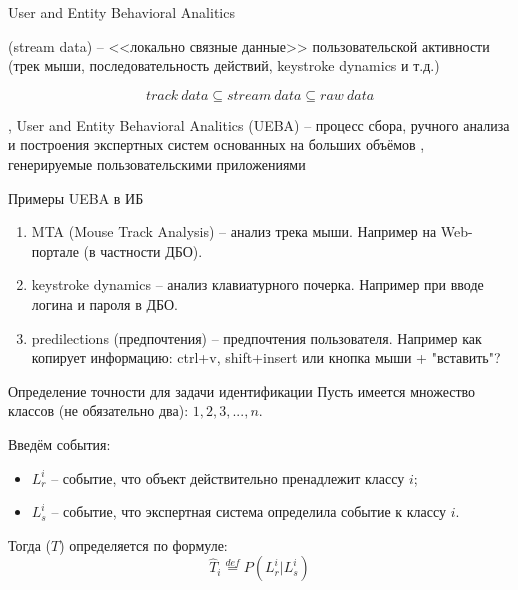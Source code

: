 \begin{frame}{User and Entity Behavioral Analitics}

	 (stream data) -- 
	<<локально связные данные>> пользовательской активности
	(трек мыши, последовательность действий, keystroke dynamics и т.д.)
	
	\begin{equation*}
	track~data \subseteq stream~data \subseteq raw~data
	\end{equation*}
	
	, User and Entity Behavioral Analitics (UEBA) --
	процесс сбора, ручного анализа и построения экспертных систем
	основанных на больших объёмов , генерируемые пользовательскими приложениями
\end{frame}

\begin{frame}{Примеры UEBA в ИБ}
	\begin{enumerate}
		\item MTA (Mouse Track Analysis) --
		анализ трека мыши.
		Например на Web-портале (в частности ДБО).
		\item keystroke dynamics --
		анализ клавиатурного почерка.
		Например при вводе логина и пароля в ДБО.
		\item predilections (предпочтения) --
		предпочтения пользователя. 
		Например как копирует информацию: ctrl+v, shift+insert или кнопка мыши + "вставить"?
	\end{enumerate}
\end{frame}

\begin{frame}{Определение точности для задачи идентификации}
	\small
	Пусть имеется множество классов (не обязательно два): $1, 2, 3, ..., n$.
	
	Введём события:
	\begin{itemize}
		\item $L_r^i$ -- событие, что объект действительно пренадлежит классу $i$;
		\item $L_s^i$ -- событие, что экспертная система определила событие к классу $i$.
	\end{itemize}
	
	Тогда  ($T$)
	определяется по формуле:
	\begin{equation}
	\hat T_i \stackrel{def}{=} P (L_r^i | L_s^i)
	\end{equation}
\end{frame}

